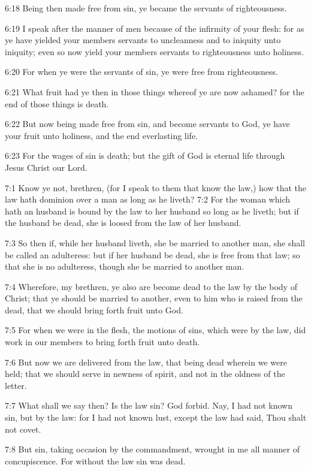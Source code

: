 6:18 Being then made free from sin, ye became the servants of
righteousness.

6:19 I speak after the manner of men because of the infirmity of your
flesh: for as ye have yielded your members servants to uncleanness and
to iniquity unto iniquity; even so now yield your members servants to
righteousness unto holiness.

6:20 For when ye were the servants of sin, ye were free from
righteousness.

6:21 What fruit had ye then in those things whereof ye are now
ashamed?  for the end of those things is death.

6:22 But now being made free from sin, and become servants to God, ye
have your fruit unto holiness, and the end everlasting life.

6:23 For the wages of sin is death; but the gift of God is eternal
life through Jesus Christ our Lord.

7:1 Know ye not, brethren, (for I speak to them that know the law,)
how that the law hath dominion over a man as long as he liveth?  7:2
For the woman which hath an husband is bound by the law to her husband
so long as he liveth; but if the husband be dead, she is loosed from
the law of her husband.

7:3 So then if, while her husband liveth, she be married to another
man, she shall be called an adulteress: but if her husband be dead,
she is free from that law; so that she is no adulteress, though she be
married to another man.

7:4 Wherefore, my brethren, ye also are become dead to the law by the
body of Christ; that ye should be married to another, even to him who
is raised from the dead, that we should bring forth fruit unto God.

7:5 For when we were in the flesh, the motions of sins, which were by
the law, did work in our members to bring forth fruit unto death.

7:6 But now we are delivered from the law, that being dead wherein we
were held; that we should serve in newness of spirit, and not in the
oldness of the letter.

7:7 What shall we say then? Is the law sin? God forbid. Nay, I had not
known sin, but by the law: for I had not known lust, except the law
had said, Thou shalt not covet.

7:8 But sin, taking occasion by the commandment, wrought in me all
manner of concupiscence. For without the law sin was dead.

